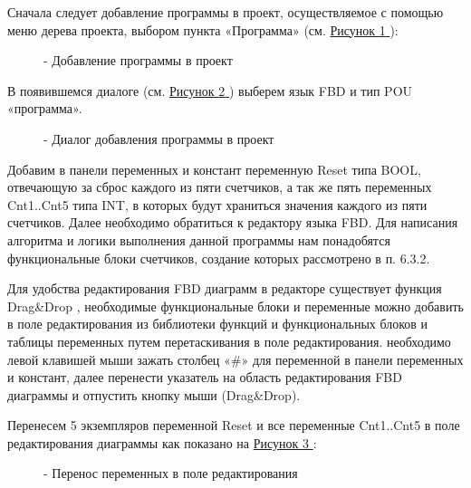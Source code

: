 \documentclass[letterpaper,10pt,russian]{sphinxmanual}
\begin{document}
Сначала следует добавление программы в проект, осуществляемое с помощью
меню дерева проекта, выбором пункта «Программа» (см. \hyperref[usage_guide/work_with_project:image153]{Рисунок \ref{usage_guide/work_with_project:image153} }):
\begin{figure}[htbp]
\centering
\capstart

\noindent{}
\caption{- Добавление программы в проект}\label{usage_guide/work_with_project:image153}\end{figure}

В появившемся диалоге (см. \hyperref[usage_guide/work_with_project:image154]{Рисунок \ref{usage_guide/work_with_project:image154} }) выберем язык FBD и тип POU
«программа».
\begin{figure}[htbp]
\centering
\capstart

\noindent{}
\caption{- Диалог добавления программы в проект}\label{usage_guide/work_with_project:image154}\end{figure}

Добавим в панели переменных и констант переменную Reset типа BOOL,
отвечающую за сброс каждого из пяти счетчиков, а так же пять переменных
Cnt1..Cnt5 типа INT, в которых будут храниться значения каждого из пяти
счетчиков. Далее необходимо обратиться к редактору языка FBD. Для
написания алгоритма и логики выполнения данной программы нам понадобятся
функциональные блоки счетчиков, создание которых рассмотрено в п. 6.3.2.

Для удобства редактирования FBD диаграмм в редакторе существует функция
Drag\&Drop , необходимые функциональные блоки и
переменные можно добавить в поле редактирования из библиотеки функций и
функциональных блоков и таблицы переменных путем
перетаскивания в поле редактирования. необходимо левой
клавишей мыши зажать столбец «\#» для переменной в панели переменных и
констант, далее перенести указатель на область редактирования FBD
диаграммы и отпустить кнопку мыши (Drag\&Drop).

Перенесем 5 экземпляров переменной Reset и все переменные Cnt1..Cnt5 в
поле редактирования диаграммы как показано на \hyperref[usage_guide/work_with_project:image155]{Рисунок \ref{usage_guide/work_with_project:image155} }:
\begin{figure}[htbp]
\centering
\capstart

\noindent{}
\caption{- Перенос переменных в поле редактирования}\label{usage_guide/work_with_project:image155}\end{figure}
\end{document}
